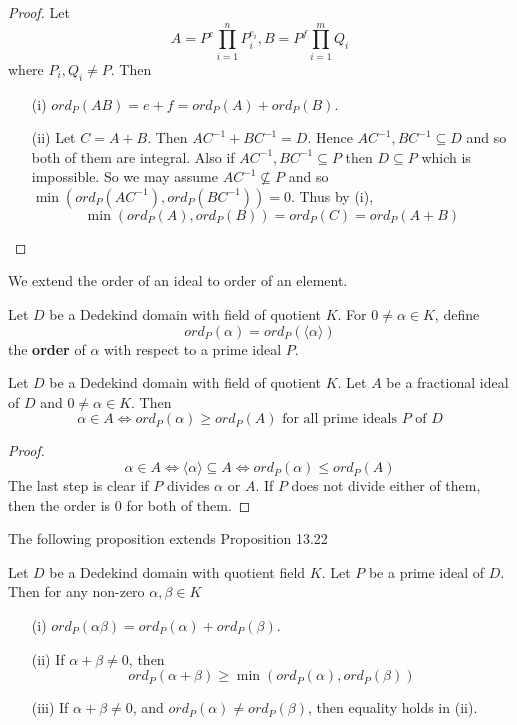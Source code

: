 \begin{proof}

Let $$A=P^{e} \prod_{i=1}^nP_i^{e_i},B=P^{f} \prod_{i=1}^m Q_i$$ where $P_i, Q_i \neq P$. Then
\begin{enumerate}
\item[(i)]
$ord_P(AB)=e+f=ord_P(A)+ord_P(B)$.
\item[(ii)] Let $C=A+B$. Then $AC^{-1}+BC^{-1}=D$. Hence $AC^{-1},BC^{-1} \subseteq D$ and so both of them are integral. Also if $AC^{-1},BC^{-1} \subseteq P$ then $D \subseteq P$ which is impossible. So we may assume
    $AC^{-1} \not \subseteq P$ and so $\min{(ord_P(AC^{-1}),ord_P(BC^{-1}))}=0$. Thus by (i),
    $$\min{(ord_P(A),ord_P(B))}=ord_P(C)=ord_P(A+B)$$
\end{enumerate}
\end{proof}
We extend the order of an ideal to order of an element.
\begin{definition} Let $D$ be a Dedekind domain with field of quotient $K$. For $0 \neq \alpha \in K$, define
$$ord_P(\alpha)=ord_P(\langle \alpha \rangle)$$
the {\bf order} of $\alpha$ with respect to a prime ideal $P$.
\end{definition}
\begin{lemma} Let $D$ be a Dedekind domain with field of quotient $K$. Let $A$ be a fractional ideal of $D$ and $0 \neq \alpha \in K$. Then
$$\alpha \in A \iff ord_P(\alpha) \ge ord_P(A) \text{ for all prime ideals } P \text{ of } D$$
\end{lemma}
\begin{proof}
$$\alpha \in A \iff \langle \alpha \rangle \subseteq A \iff ord_P(\alpha) \le ord_P(A)$$
The last step is clear if $P$ divides $\alpha$ or $A$. If $P$ does not divide either of them, then the order is $0$ for both of them.
\end{proof}
The following proposition extends Proposition 13.22
\begin{lemma} Let $D$ be a Dedekind domain with quotient field $K$. Let $P$ be a prime ideal of $D$. Then
for any non-zero $\alpha,\beta \in K$
\begin{enumerate}
\item[(i)] $ord_P(\alpha \beta)=ord_P(\alpha)+ord_P(\beta)$.
\item[(ii)] If $\alpha+\beta \neq 0$, then
$$ord_P(\alpha+\beta) \ge \min{(ord_P(\alpha),ord_P(\beta))}$$
\item[(iii)] If $\alpha+\beta \neq 0$, and $ord_P(\alpha) \neq ord_P(\beta)$, then
equality holds in (ii).
\end{enumerate}
\end{lemma}
